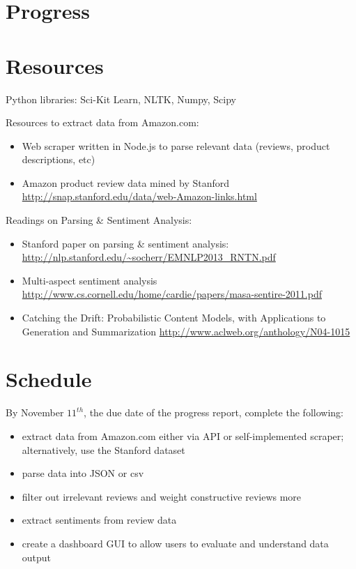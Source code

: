 \documentclass{article}
\begin{document}
\section{Progress}

\section{Resources}

Python libraries: Sci-Kit Learn, NLTK, Numpy, Scipy

Resources to extract data from Amazon.com:

\begin{itemize}
\item Web scraper written in Node.js to parse relevant data (reviews, product descriptions, etc)

\item Amazon product review data mined by Stanford
\newline
\url{http://snap.stanford.edu/data/web-Amazon-links.html}
\end{itemize}

Readings on Parsing \& Sentiment Analysis:
\begin{itemize}
\item Stanford paper on parsing \& sentiment analysis:
\newline
\url{http://nlp.stanford.edu/~socherr/EMNLP2013_RNTN.pdf}

\item Multi-aspect sentiment analysis
\newline 
\url{http://www.cs.cornell.edu/home/cardie/papers/masa-sentire-2011.pdf}

\item Catching the Drift: Probabilistic Content Models, with Applications to
Generation and Summarization \newline
\url{http://www.aclweb.org/anthology/N04-1015}
\end{itemize}


\section{Schedule}

By November $11^{th}$, the due date of the progress report, complete the following:

\begin{itemize}
\item extract data from Amazon.com either via API or self-implemented scraper; alternatively, use the Stanford dataset

\item parse data into JSON or csv

\item filter out irrelevant reviews and weight constructive reviews more

\item extract sentiments from review data

\item create a dashboard GUI to allow users to evaluate and understand data output
 
\end{itemize}
\end{document}
